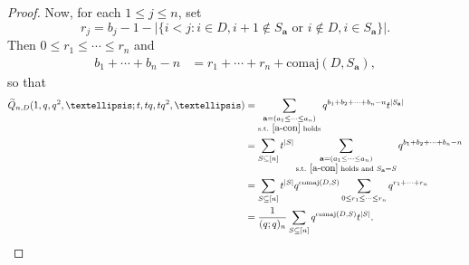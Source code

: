 \documentclass[11pt]{article}
\theoremstyle{definition}
\numberwithin{equation}{section}
\newcommand\comaj{\mathrm{comaj}}
\newcommand\Qtil{\widetilde{Q}}
\begin{document}
\begin{proof}
    Now, for each $1 \le j \le n$, set 
    \[
    r_j = b_j - 1 - |\{ i < j : i \in D, i+1 \not\in S_\mathbf{a} \text{ or } i \not\in D, i \in S_\mathbf{a} \}|.
    \]
    Then $0 \le r_1 \le \cdots \le r_n$ and
    \begin{align*}
    b_1 + \cdots + b_n - n 
    &= r_1 + \cdots + r_n + \comaj(D,S_\mathbf{a}),
    \end{align*}
    so that
    \begin{align*}
    \Qtil_{n,D}(1,q,q^2,\ldots;t,tq,tq^2,\ldots) &= \sum_{\substack{\mathbf{a} = (a_1 \le \cdots \le a_n) \\ \text{s.t. } \eqref{a-con} \text{ holds}}} q^{b_1 + b_2 + \cdots + b_n - n}t^{|S_\mathbf{a}|} \\
    &= \sum_{S \subseteq [n]} t^{|S|} \sum_{\substack{\mathbf{a} = (a_1 \le \cdots \le a_n) \\ \text{s.t. } \eqref{a-con} \text{ holds and } S_\mathbf{a} = S}} q^{b_1 + b_2 + \cdots + b_n - n} \\
    &= \sum_{S \subseteq [n]} t^{|S|} q^{\comaj(D,S)} \sum_{0 \le r_1 \le \cdots \le r_n} q^{r_1+\cdots+r_n} \\
    &= \frac{1}{(q;q)_n} \sum_{S \subseteq [n]} q^{\comaj(D,S)} t^{|S|}.\qedhere
    \end{align*}
\end{proof}
\end{document}
